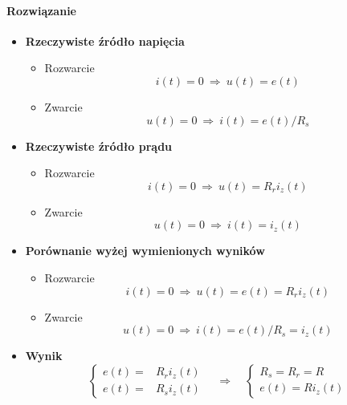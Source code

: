 \documentclass[12pt, a4paper]{article}
\begin{document}
\paragraph{Rozwiązanie}
\begin{itemize}
  \item \textbf{Rzeczywiste źródło napięcia}
        \begin{itemize}
          \item Rozwarcie
                $$
                  i(t) = 0 \: \Rightarrow \: u(t) = e(t)
                $$
          \item Zwarcie
                $$
                  u(t) = 0 \: \Rightarrow \: i(t) = e(t)/R_s
                $$
        \end{itemize}
  \item \textbf{Rzeczywiste źródło prądu}
        \begin{itemize}
          \item Rozwarcie
                $$
                  i(t) = 0 \: \Rightarrow \: u(t) = R_ri_z(t)
                $$
          \item Zwarcie
                $$
                  u(t) = 0 \: \Rightarrow \: i(t) = i_z(t)
                $$
        \end{itemize}
  \item \textbf{Porównanie wyżej wymienionych wyników}
        \begin{itemize}
          \item Rozwarcie
                $$
                  i(t) = 0 \: \Rightarrow \: u(t) = e(t) = R_ri_z(t)
                $$
          \item Zwarcie
                $$
                  u(t) = 0 \: \Rightarrow \: i(t) = e(t)/R_s = i_z(t)
                $$
        \end{itemize}
  \item \textbf{Wynik}
        $$
          \left\{
          \begin{array}{rl}
            e(t) = & R_ri_z(t) \\
            e(t) = & R_si_z(t)
          \end{array}
          \right.
          \quad \Rightarrow \quad
          \left\{
          \begin{array}{r}
            R_s = R_r = R \\
            e(t) = Ri_z(t)
          \end{array}
          \right.
        $$
\end{itemize}
\end{document}
